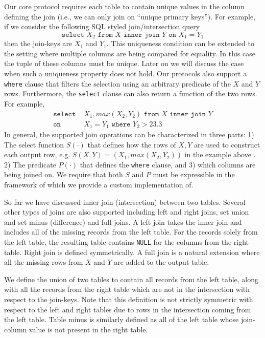 \fi
Our core protocol requires each table to contain unique values in the column defining the join  (i.e., we can only join on ``unique primary keys''). For example, if we consider the following SQL styled join/intersection query
$$
\texttt{select } X_2 \texttt{ from } X \texttt{ inner join } Y \texttt{ on } X_1 = Y_1
$$
then the join-keys are $X_1$ and $Y_1$. This uniqueness condition can be extended to the setting where multiple columns are being compared for equality. 
\iffullversion
In this case the tuple of these columns must be unique. 
\fi
Later on we will discuss the case when such a uniqueness property does not hold. Our protocols also support a \texttt{where} clause that filters the selection using an arbitrary predicate of the $X$ and $Y$ rows. Furthermore, the \texttt{select} clause can also return a function of the two rows. For example,
\begin{align*}
\texttt{select }&  X_1,max(X_2, Y_2)  \texttt{ from } X \texttt{ inner join } Y \\
\texttt{on }& X_1 = Y_1 \texttt{ where } Y_2 > 23.3
\end{align*}
In general, the supported join operations can be characterized in three parts: 1) The select function $S(\cdot)$ that defines how the rows of $X,Y$ are used to construct each output row, e.g. $S(X,Y)=(X_1, max(X_2,Y_2))$
\iffullversion
in the example above
\fi. 2) The predicate $P(\cdot)$ that defines the \texttt{where} clause, and 3) which columns are being joined on.
\iffullversion
 We require that both $S$ and $P$ must be expressible in the framework of \cite{aby3} which we provide a custom implementation of.
\fi

\iffullversion
So far we have discussed inner join (intersection) between two tables. 
\fi
Several other types of joins are also supported including left and right joins, set union and set minus (difference) and full joins. A left join takes the inner join and includes all of the missing records from the left table. For the records solely from the left table, the resulting table contains \texttt{NULL} for the columns from the right table. Right join is defined symmetrically. A full join is a natural extension where all the missing rows from $X$ and $Y$ are added to the output table.

We define the union of two tables to contain all records from the left table, along with all the records from the right table which are not in the intersection with respect to the join-keys. Note that this definition is not strictly symmetric with respect to the left and right tables due to rows in the intersection coming from the left table. %
Table minus is similarly defined as all of the left table whose join-column value is not present in the right table. 

